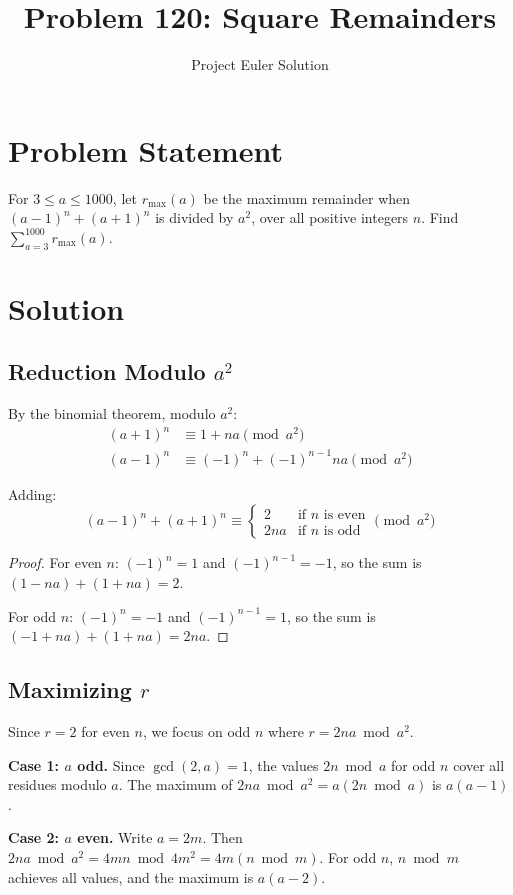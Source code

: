 \documentclass[12pt]{article}
\title{Problem 120: Square Remainders}
\author{Project Euler Solution}
\date{}
\begin{document}
\maketitle

\section{Problem Statement}
For $3 \le a \le 1000$, let $r_{\max}(a)$ be the maximum remainder when $(a-1)^n + (a+1)^n$ is divided by $a^2$, over all positive integers $n$. Find $\displaystyle\sum_{a=3}^{1000} r_{\max}(a)$.

\section{Solution}

\subsection{Reduction Modulo $a^2$}
By the binomial theorem, modulo $a^2$:
\begin{align*}
(a+1)^n &\equiv 1 + na \pmod{a^2} \\
(a-1)^n &\equiv (-1)^n + (-1)^{n-1} na \pmod{a^2}
\end{align*}

Adding:
\[
(a-1)^n + (a+1)^n \equiv
\begin{cases}
2 & \text{if } n \text{ is even} \\
2na & \text{if } n \text{ is odd}
\end{cases}
\pmod{a^2}
\]

\begin{proof}
For even $n$: $(-1)^n = 1$ and $(-1)^{n-1} = -1$, so the sum is $(1 - na) + (1 + na) = 2$.

For odd $n$: $(-1)^n = -1$ and $(-1)^{n-1} = 1$, so the sum is $(-1 + na) + (1 + na) = 2na$.
\end{proof}

\subsection{Maximizing $r$}
Since $r = 2$ for even $n$, we focus on odd $n$ where $r = 2na \bmod a^2$.

\textbf{Case 1: $a$ odd.} Since $\gcd(2, a) = 1$, the values $2n \bmod a$ for odd $n$ cover all residues modulo $a$. The maximum of $2na \bmod a^2 = a(2n \bmod a)$ is $a(a-1)$.

\textbf{Case 2: $a$ even.} Write $a = 2m$. Then $2na \bmod a^2 = 4mn \bmod 4m^2 = 4m(n \bmod m)$. For odd $n$, $n \bmod m$ achieves all values, and the maximum is $a(a - 2)$.
\end{document}
